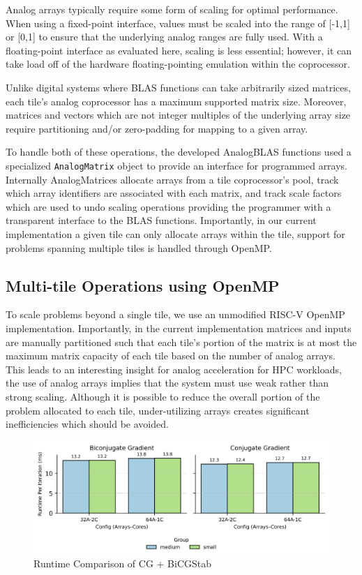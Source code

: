Analog arrays typically require some form of scaling for optimal performance.
When using a fixed-point interface, values must be scaled into the range of [-1,1] or [0,1] to ensure that the underlying analog ranges are fully used.
With a floating-point interface as evaluated here, scaling is less essential; however, it can take load off of the hardware floating-pointing emulation within the coprocessor.

Unlike digital systems where BLAS functions can take arbitrarily sized matrices, each tile's analog coprocessor has a maximum supported matrix size.
Moreover, matrices and vectors which are not integer multiples of the underlying array size require partitioning and/or zero-padding for mapping to a given array.

To handle both of these operations, the developed AnalogBLAS functions used a specialized \texttt{AnalogMatrix} object to provide an interface for programmed arrays.
Internally AnalogMatrices allocate arrays from a tile coprocessor's pool, track which array identifiers are associated with each matrix, and track scale factors which are used to undo scaling operations providing the programmer with a transparent interface to the BLAS functions.
Importantly, in our current implementation a given tile can only allocate arrays within the tile, support for problems spanning multiple tiles is handled through OpenMP.

\subsection{Multi-tile Operations using OpenMP}

To scale problems beyond a single tile, we use an unmodified RISC-V OpenMP implementation.
Importantly, in the current implementation matrices and inputs are manually partitioned such that each tile's portion of the matrix is at most the maximum matrix capacity of each tile based on the number of analog arrays.
This leads to an interesting insight for analog acceleration for HPC workloads, the use of analog arrays implies that the system must use weak rather than strong scaling.
Although it is possible to reduce the overall portion of the problem allocated to each tile, under-utilizing arrays creates significant inefficiencies which should be avoided.

\begin{figure}[ht]
    \centering
    \includegraphics[scale=0.42]{figures/results.png}
    \vspace{-10pt}
    \caption{Runtime Comparison of CG + BiCGStab}
    \label{fig:array_core}
    \vspace{-18pt}
\end{figure}

